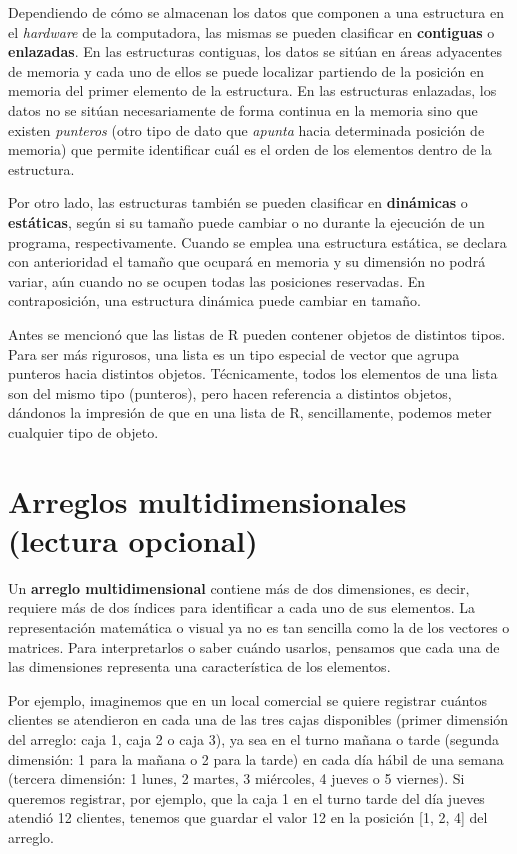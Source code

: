 \documentclass[
]{book}
\begin{document}
Dependiendo de cómo se almacenan los datos que componen a una estructura en el \emph{hardware} de la computadora, las mismas se pueden clasificar en \textbf{contiguas} o \textbf{enlazadas}. En las estructuras contiguas, los datos se sitúan en áreas adyacentes de memoria y cada uno de ellos se puede localizar partiendo de la posición en memoria del primer elemento de la estructura. En las estructuras enlazadas, los datos no se sitúan necesariamente de forma continua en la memoria sino que existen \emph{punteros} (otro tipo de dato que \emph{apunta} hacia determinada posición de memoria) que permite identificar cuál es el orden de los elementos dentro de la estructura.

Por otro lado, las estructuras también se pueden clasificar en \textbf{dinámicas} o \textbf{estáticas}, según si su tamaño puede cambiar o no durante la ejecución de un programa, respectivamente. Cuando se emplea una estructura estática, se declara con anterioridad el tamaño que ocupará en memoria y su dimensión no podrá variar, aún cuando no se ocupen todas las posiciones reservadas. En contraposición, una estructura dinámica puede cambiar en tamaño.

Antes se mencionó que las listas de R pueden contener objetos de distintos tipos. Para ser más rigurosos, una lista es un tipo especial de vector que agrupa punteros hacia distintos objetos. Técnicamente, todos los elementos de una lista son del mismo tipo (punteros), pero hacen referencia a distintos objetos, dándonos la impresión de que en una lista de R, sencillamente, podemos meter cualquier tipo de objeto.

\hypertarget{arreglos-multidimensionales-lectura-opcional}{%
\section{Arreglos multidimensionales (lectura opcional)}\label{arreglos-multidimensionales-lectura-opcional}}

Un \textbf{arreglo multidimensional} contiene más de dos dimensiones, es decir, requiere más de dos índices para identificar a cada uno de sus elementos. La representación matemática o visual ya no es tan sencilla como la de los vectores o matrices. Para interpretarlos o saber cuándo usarlos, pensamos que cada una de las dimensiones representa una característica de los elementos.

Por ejemplo, imaginemos que en un local comercial se quiere registrar cuántos clientes se atendieron en cada una de las tres cajas disponibles (primer dimensión del arreglo: caja 1, caja 2 o caja 3), ya sea en el turno mañana o tarde (segunda dimensión: 1 para la mañana o 2 para la tarde) en cada día hábil de una semana (tercera dimensión: 1 lunes, 2 martes, 3 miércoles, 4 jueves o 5 viernes). Si queremos registrar, por ejemplo, que la caja 1 en el turno tarde del día jueves atendió 12 clientes, tenemos que guardar el valor 12 en la posición {[}1, 2, 4{]} del arreglo.
\end{document}
